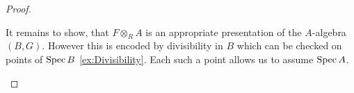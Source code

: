 \begin{proof}
\begin{itemize}

	It remains to show, that $F \otimes_R A$ is an appropriate presentation of the $A$-algebra $(B,G)$. However this is encoded by divisibility in $B$ which can be checked on points of $\operatorname{Spec} B$ \ref{ex:Divisibility}. Each such a point allows us to assume $\operatorname{Spec} A$. %
		\end{itemize}
	
\end{proof}



